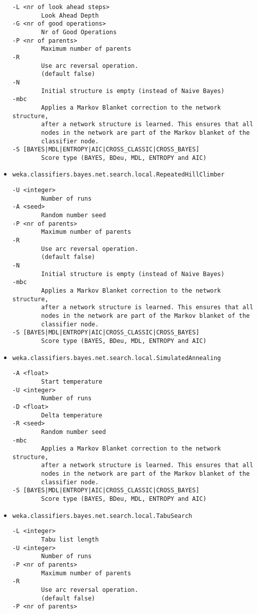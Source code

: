 \documentclass[a4paper]{article}
\begin{document}
\begin{itemize}
\begin{verbatim}
-L <nr of look ahead steps>
        Look Ahead Depth
-G <nr of good operations>
        Nr of Good Operations
-P <nr of parents>
        Maximum number of parents
-R
        Use arc reversal operation.
        (default false)
-N
        Initial structure is empty (instead of Naive Bayes)
-mbc
        Applies a Markov Blanket correction to the network structure,
        after a network structure is learned. This ensures that all
        nodes in the network are part of the Markov blanket of the
        classifier node.
-S [BAYES|MDL|ENTROPY|AIC|CROSS_CLASSIC|CROSS_BAYES]
        Score type (BAYES, BDeu, MDL, ENTROPY and AIC)
  \end{verbatim}
\item \texttt{weka.classifiers.bayes.net.search.local.RepeatedHillClimber}
  \begin{verbatim}
-U <integer>
        Number of runs
-A <seed>
        Random number seed
-P <nr of parents>
        Maximum number of parents
-R
        Use arc reversal operation.
        (default false)
-N
        Initial structure is empty (instead of Naive Bayes)
-mbc
        Applies a Markov Blanket correction to the network structure,
        after a network structure is learned. This ensures that all
        nodes in the network are part of the Markov blanket of the
        classifier node.
-S [BAYES|MDL|ENTROPY|AIC|CROSS_CLASSIC|CROSS_BAYES]
        Score type (BAYES, BDeu, MDL, ENTROPY and AIC)
  \end{verbatim}
\item \texttt{weka.classifiers.bayes.net.search.local.SimulatedAnnealing}
  \begin{verbatim}
-A <float>
        Start temperature
-U <integer>
        Number of runs
-D <float>
        Delta temperature
-R <seed>
        Random number seed
-mbc
        Applies a Markov Blanket correction to the network structure,
        after a network structure is learned. This ensures that all
        nodes in the network are part of the Markov blanket of the
        classifier node.
-S [BAYES|MDL|ENTROPY|AIC|CROSS_CLASSIC|CROSS_BAYES]
        Score type (BAYES, BDeu, MDL, ENTROPY and AIC)
  \end{verbatim}
\item \texttt{weka.classifiers.bayes.net.search.local.TabuSearch}
  \begin{verbatim}
-L <integer>
        Tabu list length
-U <integer>
        Number of runs
-P <nr of parents>
        Maximum number of parents
-R
        Use arc reversal operation.
        (default false)
-P <nr of parents>

\end{verbatim}
\end{itemize}
\end{document}
